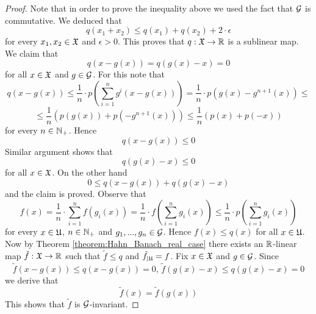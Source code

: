 \begin{proof}
Note that in order to prove the inequality above we used the fact that ${\mathcal G}$ is commutative. We deduced that
$$q(x_1 + x_2) \leq q(x_1) + q(x_2) + 2\cdot \epsilon$$
for every $x_1,x_2\in {\mathfrak X}$ and $\epsilon > 0$. This proves that $q:{\mathfrak X} \rightarrow {\mathbb R}$ is a sublinear map. We claim that 
$$q\left(x - g(x)\right) = q\left(g(x) - x\right) = 0$$
for all $x\in {\mathfrak X}$ and $g\in {\mathcal G}$. For this note that
$$q\left(x - g(x)\right) \leq \frac{1}{n}\cdot p\left(\sum_{i=1}^ng^i\left(x - g(x)\right)\right) = \frac{1}{n}\cdot p\left(g(x) - g^{n+1}(x)\right) \leq$$
$$\leq \frac{1}{n}\left(p\left(g(x)\right) + p\left(-g^{n+1}(x)\right)\right) \leq \frac{1}{n}\left(p(x) + p(-x)\right)$$
for every $n\in {\mathbb N}_+$. Hence 
$$q\left(x - g(x)\right) \leq 0$$
Similar argument shows that
$$q\left(g(x) - x\right) \leq 0$$
for all $x \in {\mathfrak X}$. On the other hand
$$0 \leq q\left(x - g(x)\right) + q\left(g(x) - x\right)$$
and the claim is proved. Observe that
$$f(x) = \frac{1}{n}\cdot \sum_{i=1}^nf\left(g_i(x)\right) = \frac{1}{n}\cdot f\left(\sum_{i=1}^ng_i(x)\right) \leq \frac{1}{n}\cdot p\left(\sum_{i=1}^ng_i(x)\right)$$
for every $x \in {\mathfrak U}$, $n\in {\mathbb N}_+$ and $g_1,...,g_n\in {\mathcal G}$. Hence $f(x) \leq q(x)$ for all $x\in {\mathfrak U}$. Now by Theorem \ref{theorem:Hahn_Banach_real_case} there exists an ${\mathbb R}$-linear map $\tilde{f}:{\mathfrak X}\rightarrow {\mathbb R}$ such that $\tilde{f} \leq q$ and $\tilde{f}_{\mid {\mathfrak U}} = f$. Fix $x \in {\mathfrak X}$ and $g \in {\mathcal G}$. Since
$$\tilde{f}\left(x - g(x)\right) \leq q\left(x - g(x)\right) = 0,\,\tilde{f}\left(g(x) - x\right) \leq q\left(g(x) - x\right) = 0$$
we derive that
$$\tilde{f}(x) = \tilde{f}\left(g(x)\right)$$
This shows that $\tilde{f}$ is ${\mathcal G}$-invariant.
\end{proof}













\small




